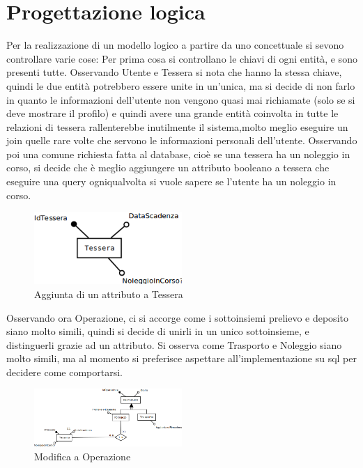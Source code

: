 \documentclass[a4paper,twoside]{article}
\begin{document}
\section{Progettazione logica}
Per la realizzazione di un modello logico a partire da uno concettuale si sevono controllare varie cose:\newline
Per prima cosa si controllano le chiavi di ogni entità, e sono presenti tutte.\newline
Osservando Utente e Tessera si nota che hanno la stessa chiave, quindi le due entità potrebbero essere unite in un'unica, ma si decide di non farlo in quanto le informazioni dell'utente non vengono quasi mai richiamate (solo se si deve mostrare il profilo) e quindi avere una grande entità coinvolta in tutte le relazioni di tessera rallenterebbe inutilmente il sistema,molto meglio eseguire un join quelle rare volte che servono le informazioni personali dell'utente.\newline
Osservando poi una comune richiesta fatta al database, cioè se una tessera ha un noleggio in corso, si decide che è meglio aggiungere un attributo booleano a tessera che eseguire una query ogniqualvolta si vuole sapere se l'utente ha un noleggio in corso.
\begin{figure}[H]
 \centering
  \includegraphics[width=0.5\textwidth]{Immagini-Grafici/Logico01.png}
\caption{Aggiunta di un attributo a Tessera}
\end{figure}
Osservando ora Operazione, ci si accorge come i sottoinsiemi prelievo e deposito siano molto simili, quindi si decide di unirli in un unico sottoinsieme, e distinguerli grazie ad un attributo.\newline
Si osserva come Trasporto e Noleggio siano molto simili, ma al momento si preferisce aspettare all'implementazione su sql per decidere come comportarsi.
\begin{figure}[H]
 \centering
  \includegraphics[width=0.5\textwidth]{Immagini-Grafici/Logico02.png}
\caption{Modifica a Operazione}
\end{figure}
\end{document}
